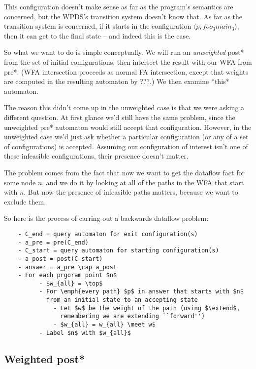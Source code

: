 \documentclass{article}
\newcommand{\Config}[2]{\ensuremath{\langle #1, #2 \rangle}}
\newcommand{\meet}{\sqcap}
\newcommand{\extend}{\otimes}
\begin{document}
This configuration doesn't make sense as far as the program's
semantics are concerned, but the WPDS's transition system doesn't know
that. As far as the transition system is concerned, if it starts in
the configuration \Config{p}{foo_3 main_3}, then it can get to the
final state -- and indeed this is the case. 

So what we want to do is simple conceptually. We will run an
\emph{unweighted} post* from the set of initial configurations, then
intersect the result with our WFA from pre*. (WFA intersection
proceeds as normal FA intersection, except that weights are computed
in the resulting automaton by ???.) We then examine *this* automaton.

  The reason this didn't come up in the unweighted case is that we
  were asking a different question. At first glance we'd still have
  the same problem, since the unweighted pre* automaton would still
  accept that configuration. However, in the unweighted case we'd just
  ask whether a particular configuration (or any of a set of
  configurations) is accepted. Assuming our configuration of interest
  isn't one of these infeasible configurations, their presence doesn't
  matter.
  
  The problem comes from the fact that now we want to get the dataflow
  fact for some node $n$, and we do it by looking at all of the paths
  in the WFA that start with $n$. But now the presence of infeasible
  paths matters, because we want to exclude them.

So here is the process of carring out a backwards dataflow problem:
\begin{verbatim}
    - C_end = query automaton for exit configuration(s)
    - a_pre = pre(C_end)
    - C_start = query automaton for starting configuration(s)
    - a_post = post(C_start)
    - answer = a_pre \cap a_post
    - For each prgoram point $n$
          - $w_{all} = \top$
          - For \emph{every path} $p$ in answer that starts with $n$
            from an initial state to an accepting state
              - Let $w$ be the weight of the path (using $\extend$,
                remembering we are extending ``forward'')
              - $w_{all} = w_{all} \meet w$
          - Label $n$ with $w_{all}$
\end{verbatim}

\subsection{Weighted post*}
\end{document}
